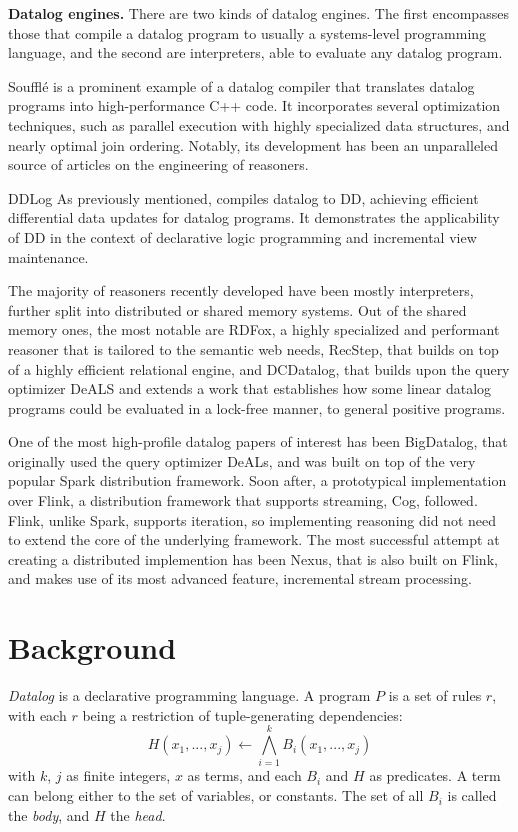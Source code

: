 \documentclass[sigconf,screen,review=false,natbib]{acmart}
\theoremstyle{definition}
\begin{document}
\textbf{Datalog engines.} There are two kinds of datalog engines. The first encompasses those that compile
a datalog program to usually a systems-level programming language, and the second are interpreters, able to
evaluate any datalog program.

Soufflé is a prominent example of a datalog compiler that translates datalog programs into high-performance
C++ code. It incorporates several optimization techniques, such as parallel execution with highly specialized data
structures\cite{souffle_btree}, and nearly optimal join ordering\cite{souffle_join}. Notably, its development has
been an unparalleled source of articles on the engineering of reasoners.

DDLog As previously mentioned, compiles datalog to DD, achieving efficient differential data updates
for datalog programs. It demonstrates the applicability of DD in the context of declarative logic
programming and incremental view maintenance.

The majority of reasoners recently developed have been mostly interpreters, further split into distributed or
shared memory systems. Out of the shared memory ones, the most notable are RDFox\cite{rdfox}, a highly specialized
and performant reasoner that is tailored to the semantic web needs, RecStep\cite{recstep}, that builds on top of a
highly efficient relational engine, and DCDatalog\cite{dcdatalog}, that builds upon the query optimizer DeALS\cite{deals}
and extends a work that establishes how some linear datalog programs could be evaluated in a lock-free manner, to
general positive programs.

One of the most high-profile datalog papers of interest has been BigDatalog\cite{bigdatalog}, that
originally used the query optimizer DeALs, and was built on top of the very popular Spark\cite{spark}
distribution framework. Soon after, a prototypical implementation\cite{cog} over Flink\cite{flink},
a distribution framework that supports streaming, Cog, followed. Flink, unlike Spark, supports
iteration, so implementing reasoning did not need to extend the core of the underlying framework. The most
successful attempt at creating a distributed implemention has been Nexus\cite{nexus}, that is also built on Flink,
and makes use of its most advanced feature, incremental stream processing.
\section{Background}
\textit{Datalog}\cite{datalog} is a declarative programming language. A program $P$ is a set of
rules $r$, with each $r$ being a restriction of tuple-generating dependencies: \[H(x_1, ..., x_j) \leftarrow \bigwedge_{i=1}^kB_i(x_1, ..., x_j) \]
with $k$, $j$ as finite integers, $x$ as terms, and each $B_i$ and $H$ as predicates. A term can belong
either to the set of variables, or constants. The set of all $B_i$ is called the \textit{body}, and $H$ the \textit{head}.
\end{document}
